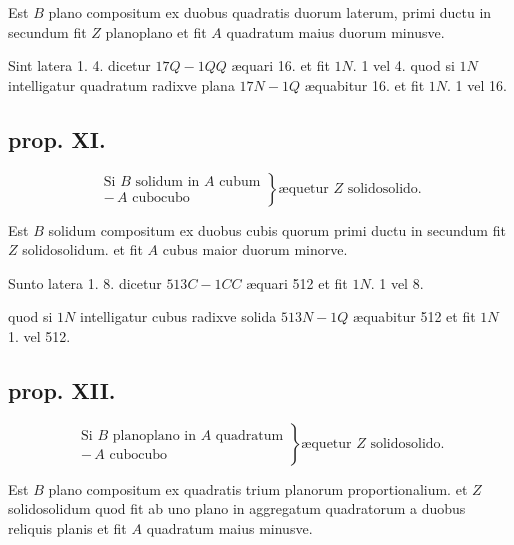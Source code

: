 \documentclass[11pt,a4paper]{article}
\begin{document}

Est $B$ plano compositum ex duobus quadratis duorum laterum, primi ductu in secundum fit $Z$ planoplano et fit $A$ quadratum maius duorum minusve.

Sint latera 1. 4. dicetur $17Q - 1QQ$ æquari 16. et fit $1N$. 1 vel 4. quod si $1N$ intelligatur quadratum radixve plana $17N - 1Q$ æquabitur 16. et fit $1N$. 1 vel 16.

\subsection*{prop. XI.}

\[ \left. \begin{array}{l} \text{Si } B \text{ solidum in } A \text{ cubum} \\ -\,A \text{ cubocubo} \end{array} \right\} \text{æquetur } Z \text{ solidosolido.} \]

Est $B$ solidum compositum ex duobus cubis quorum primi ductu in secundum fit $Z$ solidosolidum. et fit $A$ cubus maior duorum minorve.

Sunto latera 1. 8. dicetur $513C - 1CC$ æquari 512 et fit $1N$. 1 vel 8.

quod si $1N$ intelligatur cubus radixve solida $513N - 1Q$ æquabitur 512 et fit $1N$ 1. vel 512.

\subsection*{prop. XII.}

\[ \left. \begin{array}{l} \text{Si } B \text{ planoplano in } A \text{ quadratum} \\ -\,A \text{ cubocubo} \end{array} \right\} \text{æquetur } Z \text{ solidosolido.} \]

Est $B$ plano compositum ex quadratis trium planorum proportionalium. et $Z$ solidosolidum quod fit ab uno plano in aggregatum quadratorum a duobus reliquis planis et fit $A$ quadratum maius minusve.
\end{document}
